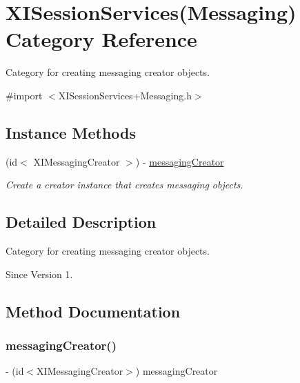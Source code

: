 \hypertarget{category_x_i_session_services_07_messaging_08}{}\section{X\+I\+Session\+Services(Messaging) Category Reference}
\label{category_x_i_session_services_07_messaging_08}


Category for creating messaging creator objects.  




{\ttfamily \#import $<$X\+I\+Session\+Services+\+Messaging.\+h$>$}

\subsection*{Instance Methods}
\begin{DoxyCompactItemize}
\item 
(id$<$ X\+I\+Messaging\+Creator $>$) -\/ \hyperlink{category_x_i_session_services_07_messaging_08_a27522172b7b17451547a70108b6e3a73}{messaging\+Creator}
\begin{DoxyCompactList}\small\item\em Create a creator instance that creates messaging objects. \end{DoxyCompactList}\end{DoxyCompactItemize}


\subsection{Detailed Description}
Category for creating messaging creator objects. 

\begin{DoxySince}{Since}
Version 1. 
\end{DoxySince}


\subsection{Method Documentation}
\hypertarget{category_x_i_session_services_07_messaging_08_a27522172b7b17451547a70108b6e3a73}{}\label{category_x_i_session_services_07_messaging_08_a27522172b7b17451547a70108b6e3a73} 
\subsubsection{\texorpdfstring{messaging\+Creator()}{messagingCreator()}}
{\footnotesize\ttfamily -\/ (id$<$X\+I\+Messaging\+Creator$>$) messaging\+Creator \begin{DoxyParamCaption}{ }\end{DoxyParamCaption}}



